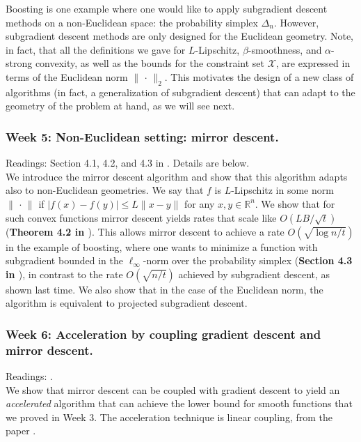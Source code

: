 Boosting is one example where one would like to apply subgradient descent methods on a non-Euclidean space: the probability simplex $\Delta_n$. However, subgradient descent methods are only designed for the Euclidean geometry. Note, in fact, that all the definitions we gave for $L$-Lipschitz, $\beta$-smoothness, and $\alpha$-strong convexity, as well as the bounds for the constraint set $\mathcal{X}$, are expressed in terms of the Euclidean norm $\|\,\cdot\,\|_2$. This motivates the design of a new class of algorithms (in fact, a generalization of subgradient descent) that can adapt to the geometry of the problem at hand, as we will see next.

\subsubsection*{Week 5: Non-Euclidean setting: mirror descent.}
Readings: Section 4.1, 4.2, and 4.3 in \cite{bubeck}. Details are below.\\

We introduce the mirror descent algorithm and show that this algorithm adapts also to non-Euclidean geometries. We say that $f$ is $L$-Lipschitz in some norm $\|\,\cdot\,\|$ if $|f(x) - f(y)| \le L \| x - y \|$ for any $x,y\in\mathbb{R}^n$. We show that for such convex functions mirror descent yields rates that scale like $O(LB/\sqrt{t})$ (\textbf{Theorem 4.2 in \cite{bubeck}}). This allows mirror descent to achieve a rate $O(\sqrt{\log n/t})$ in the example of boosting, where one wants to minimize a function with subgradient bounded in the $\ell_\infty$-norm over the probability simplex (\textbf{Section 4.3 in \cite{bubeck}}), in contrast to the rate $O(\sqrt{n/t})$ achieved by subgradient descent, as shown last time. We also show that in the case of the Euclidean norm, the algorithm is equivalent to projected subgradient descent.

\subsubsection*{Week 6: Acceleration by coupling gradient descent and mirror descent.}
Readings: \cite{linearcoupling}.\\

We show that mirror descent can be coupled with gradient descent to yield an \emph{accelerated} algorithm that can achieve the lower bound for smooth functions that we proved in Week 3. The acceleration technique is linear coupling, from the paper \cite{linearcoupling}.

